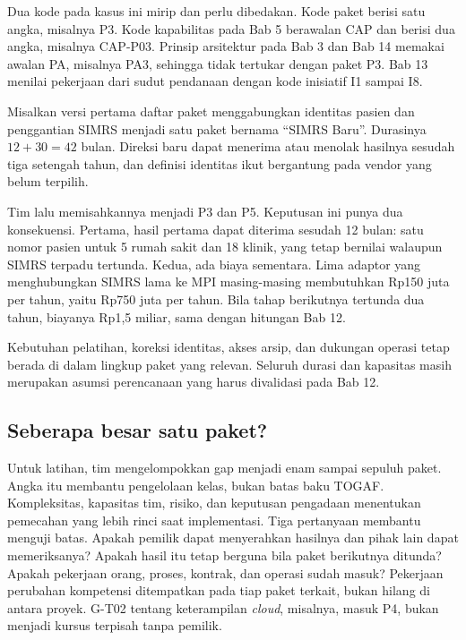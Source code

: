 Dua kode pada kasus ini mirip dan perlu dibedakan. Kode paket berisi satu angka, misalnya P3.
Kode kapabilitas pada Bab 5 berawalan CAP dan berisi dua angka, misalnya CAP-P03. Prinsip
arsitektur pada Bab 3 dan Bab 14 memakai awalan PA, misalnya PA3, sehingga tidak tertukar dengan
paket P3. Bab 13 menilai pekerjaan dari sudut pendanaan dengan kode inisiatif I1 sampai I8.

\begin{kasus}[title={Kasus Medikara Health: Memisahkan Identitas Pasien dari Penggantian SIMRS}]
Misalkan versi pertama daftar paket menggabungkan identitas pasien dan penggantian SIMRS menjadi satu
paket bernama ``SIMRS Baru''. Durasinya $12 + 30 = 42$ bulan. Direksi baru dapat menerima atau
menolak hasilnya sesudah tiga setengah tahun, dan definisi identitas ikut bergantung pada
vendor yang belum terpilih.

Tim lalu memisahkannya menjadi P3 dan P5. Keputusan ini punya dua konsekuensi. Pertama, hasil
pertama dapat diterima sesudah 12 bulan: satu nomor pasien untuk 5 rumah sakit dan 18 klinik,
yang tetap bernilai walaupun SIMRS terpadu tertunda. Kedua, ada biaya sementara. Lima adaptor
yang menghubungkan SIMRS lama ke MPI masing-masing membutuhkan Rp150 juta per tahun, yaitu
Rp750 juta per tahun. Bila tahap berikutnya tertunda dua tahun, biayanya Rp1,5 miliar, sama
dengan hitungan Bab 12.

Kebutuhan pelatihan, koreksi identitas, akses arsip, dan dukungan operasi tetap berada di dalam
lingkup paket yang relevan. Seluruh durasi dan kapasitas masih merupakan asumsi perencanaan yang
harus divalidasi pada Bab 12.
\end{kasus}

\subsection*{Seberapa besar satu paket?}

Untuk latihan, tim mengelompokkan gap menjadi enam sampai sepuluh paket. Angka itu membantu
pengelolaan kelas, bukan batas baku TOGAF. Kompleksitas, kapasitas tim, risiko, dan keputusan
pengadaan menentukan pemecahan yang lebih rinci saat implementasi. Tiga pertanyaan membantu
menguji batas. Apakah pemilik dapat menyerahkan hasilnya dan pihak lain dapat memeriksanya?
Apakah hasil itu tetap berguna bila paket berikutnya ditunda? Apakah pekerjaan orang, proses,
kontrak, dan operasi sudah masuk? Pekerjaan perubahan kompetensi ditempatkan pada tiap paket
terkait, bukan hilang di antara proyek. G-T02 tentang keterampilan \textit{cloud}, misalnya,
masuk P4, bukan menjadi kursus terpisah tanpa pemilik.

